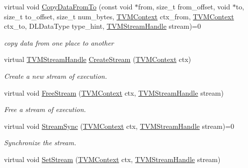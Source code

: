 \begin{DoxyCompactItemize}
virtual void \hyperlink{classtvm_1_1runtime_1_1DeviceAPI_a0cdbc58366129d3d6185bf7ae20a3226}{Copy\+Data\+From\+To} (const void $\ast$from, size\+\_\+t from\+\_\+offset, void $\ast$to, size\+\_\+t to\+\_\+offset, size\+\_\+t num\+\_\+bytes, \hyperlink{c__runtime__api_8h_a9363bb701f16ce5bbb381f2a013d25b4}{T\+V\+M\+Context} ctx\+\_\+from, \hyperlink{c__runtime__api_8h_a9363bb701f16ce5bbb381f2a013d25b4}{T\+V\+M\+Context} ctx\+\_\+to, D\+L\+Data\+Type type\+\_\+hint, \hyperlink{c__runtime__api_8h_ab1d5f6b7945e1410602a8a057fda5757}{T\+V\+M\+Stream\+Handle} stream)=0
\begin{DoxyCompactList}\small\item\em copy data from one place to another \end{DoxyCompactList}\item 
virtual \hyperlink{c__runtime__api_8h_ab1d5f6b7945e1410602a8a057fda5757}{T\+V\+M\+Stream\+Handle} \hyperlink{classtvm_1_1runtime_1_1DeviceAPI_a67cf0799e8c50432379769022adafe66}{Create\+Stream} (\hyperlink{c__runtime__api_8h_a9363bb701f16ce5bbb381f2a013d25b4}{T\+V\+M\+Context} ctx)
\begin{DoxyCompactList}\small\item\em Create a new stream of execution. \end{DoxyCompactList}\item 
virtual void \hyperlink{classtvm_1_1runtime_1_1DeviceAPI_a8a4d70bbe1db295e42126835bf7f19df}{Free\+Stream} (\hyperlink{c__runtime__api_8h_a9363bb701f16ce5bbb381f2a013d25b4}{T\+V\+M\+Context} ctx, \hyperlink{c__runtime__api_8h_ab1d5f6b7945e1410602a8a057fda5757}{T\+V\+M\+Stream\+Handle} stream)
\begin{DoxyCompactList}\small\item\em Free a stream of execution. \end{DoxyCompactList}\item 
virtual void \hyperlink{classtvm_1_1runtime_1_1DeviceAPI_a359964ae5ad0fbdba18da1a0db1a7ad6}{Stream\+Sync} (\hyperlink{c__runtime__api_8h_a9363bb701f16ce5bbb381f2a013d25b4}{T\+V\+M\+Context} ctx, \hyperlink{c__runtime__api_8h_ab1d5f6b7945e1410602a8a057fda5757}{T\+V\+M\+Stream\+Handle} stream)=0
\begin{DoxyCompactList}\small\item\em Synchronize the stream. \end{DoxyCompactList}\item 
virtual void \hyperlink{classtvm_1_1runtime_1_1DeviceAPI_a2bf972e88ccbb2f896b061730655cf46}{Set\+Stream} (\hyperlink{c__runtime__api_8h_a9363bb701f16ce5bbb381f2a013d25b4}{T\+V\+M\+Context} ctx, \hyperlink{c__runtime__api_8h_ab1d5f6b7945e1410602a8a057fda5757}{T\+V\+M\+Stream\+Handle} stream)

\end{DoxyCompactItemize}
